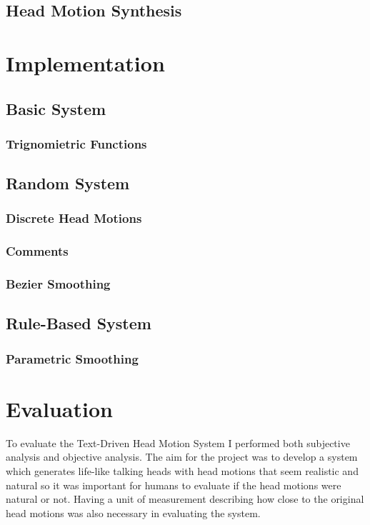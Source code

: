 \documentclass[bsc,frontabs,twoside,singlespacing,parskip]{infthesis}
\begin{document}
\section{Head Motion Synthesis}

\chapter{Implementation}

\section{Basic System}
\subsection{Trignomietric Functions}

\section{Random System}
\subsection{Discrete Head Motions}
\subsection{Comments}
\subsection{Bezier Smoothing}

\section{Rule-Based System}
\subsection{Parametric Smoothing}
	
\chapter{Evaluation}

To evaluate the Text-Driven Head Motion System I performed both subjective analysis and objective analysis. The aim for the project was to develop a system which generates life-like talking heads with head motions that seem realistic and natural so it was important for humans to evaluate if the head motions were natural or not. Having a unit of measurement describing how close to the original head motions was also necessary in evaluating the system.
\end{document}
